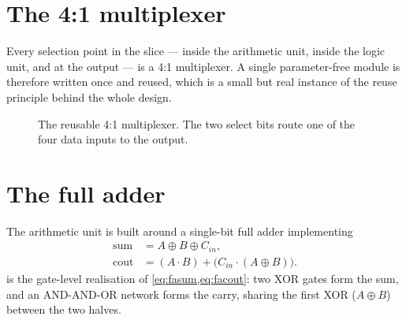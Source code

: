 \section{The 4:1 multiplexer}
Every selection point in the slice --- inside the arithmetic unit, inside
the logic unit, and at the output --- is a 4:1 multiplexer. A single
parameter-free  module is therefore written once and reused,
which is a small but real instance of the reuse principle behind the whole
design.

\begin{figure}[htbp]
\centering
{}
\caption{The reusable 4:1 multiplexer. The two select bits route one of
the four data inputs to the output.}
\label{fig:mux}
\end{figure}



\section{The full adder}
The arithmetic unit is built around a single-bit full adder implementing
\begin{align}
  \text{sum}  &= A \oplus B \oplus C_{in}, \label{eq:fasum}\\
  \text{cout} &= (A\cdot B) + \bigl(C_{in}\cdot(A\oplus B)\bigr).
  \label{eq:facout}
\end{align}
 is the gate-level realisation of
\cref{eq:fasum,eq:facout}: two XOR gates form the sum, and an
AND-AND-OR network forms the carry, sharing the first XOR ($A\oplus B$)
between the two halves.

